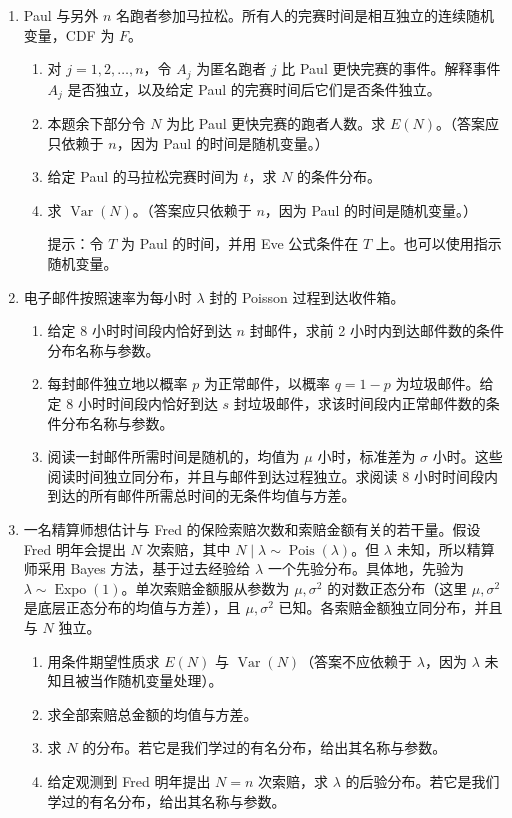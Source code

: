\documentclass[UTF8,12pt,a4paper,fontset=fandol]{ctexart}
\begin{document}
\begin{enumerate}
  \item Paul 与另外 $n$ 名跑者参加马拉松。所有人的完赛时间是相互独立的连续随机变量，CDF 为 $F$。
  \begin{enumerate}
    \item[(a)] 对 $j=1,2,\ldots,n$，令 $A_j$ 为匿名跑者 $j$ 比 Paul 更快完赛的事件。解释事件 $A_j$ 是否独立，以及给定 Paul 的完赛时间后它们是否条件独立。
    \item[(b)] 本题余下部分令 $N$ 为比 Paul 更快完赛的跑者人数。求 $E(N)$。（答案应只依赖于 $n$，因为 Paul 的时间是随机变量。）
    \item[(c)] 给定 Paul 的马拉松完赛时间为 $t$，求 $N$ 的条件分布。
    \item[(d)] 求 $\operatorname{Var}(N)$。（答案应只依赖于 $n$，因为 Paul 的时间是随机变量。）

    \noindent 提示：令 $T$ 为 Paul 的时间，并用 Eve 公式条件在 $T$ 上。也可以使用指示随机变量。
  \end{enumerate}

  \item 电子邮件按照速率为每小时 $\lambda$ 封的 Poisson 过程到达收件箱。
  \begin{enumerate}
    \item[(a)] 给定 8 小时时间段内恰好到达 $n$ 封邮件，求前 2 小时内到达邮件数的条件分布名称与参数。
    \item[(b)] 每封邮件独立地以概率 $p$ 为正常邮件，以概率 $q=1-p$ 为垃圾邮件。给定 8 小时时间段内恰好到达 $s$ 封垃圾邮件，求该时间段内正常邮件数的条件分布名称与参数。
    \item[(c)] 阅读一封邮件所需时间是随机的，均值为 $\mu$ 小时，标准差为 $\sigma$ 小时。这些阅读时间独立同分布，并且与邮件到达过程独立。求阅读 8 小时时间段内到达的所有邮件所需总时间的无条件均值与方差。
  \end{enumerate}

  \item 一名精算师想估计与 Fred 的保险索赔次数和索赔金额有关的若干量。假设 Fred 明年会提出 $N$ 次索赔，其中 $N\mid\lambda\sim\operatorname{Pois}(\lambda)$。但 $\lambda$ 未知，所以精算师采用 Bayes 方法，基于过去经验给 $\lambda$ 一个先验分布。具体地，先验为 $\lambda\sim\operatorname{Expo}(1)$。单次索赔金额服从参数为 $\mu,\sigma^2$ 的对数正态分布（这里 $\mu,\sigma^2$ 是底层正态分布的均值与方差），且 $\mu,\sigma^2$ 已知。各索赔金额独立同分布，并且与 $N$ 独立。
  \begin{enumerate}
    \item[(a)] 用条件期望性质求 $E(N)$ 与 $\operatorname{Var}(N)$（答案不应依赖于 $\lambda$，因为 $\lambda$ 未知且被当作随机变量处理）。
    \item[(b)] 求全部索赔总金额的均值与方差。
    \item[(c)] 求 $N$ 的分布。若它是我们学过的有名分布，给出其名称与参数。
    \item[(d)] 给定观测到 Fred 明年提出 $N=n$ 次索赔，求 $\lambda$ 的后验分布。若它是我们学过的有名分布，给出其名称与参数。
  \end{enumerate}


\end{enumerate}
\end{document}
